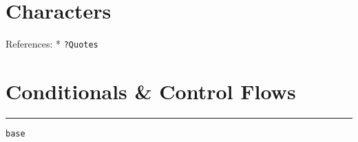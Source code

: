 \documentclass[
]{book}
\begin{document}
\hypertarget{characters}{%
\section{Characters}\label{characters}}

References:
* \texttt{?Quotes}

\hypertarget{conditionals-control-flows}{%
\section{Conditionals \& Control Flows}\label{conditionals-control-flows}}

\begin{center}\rule{0.5\linewidth}{0.5pt}\end{center}

\texttt{base}
\end{document}
